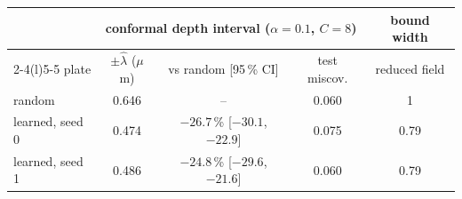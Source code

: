 \begin{tabular}{@{}l ccc c@{}}\toprule
 & \multicolumn{3}{c}{conformal depth interval ($\alpha=0.1$, $C=8$)} & bound width\\
\cmidrule(lr){2-4}\cmidrule(l){5-5}
plate & $\pm\hat\lambda$ ($\mu$m) & vs random [95\,\% CI] & test miscov. & reduced field\\\midrule
random & 0.646 & -- & 0.060 & 1\\
learned, seed 0 & 0.474 & $-26.7$\,\% [$-30.1$, $-22.9$] & 0.075 & 0.79\\
learned, seed 1 & 0.486 & $-24.8$\,\% [$-29.6$, $-21.6$] & 0.060 & 0.79\\
\bottomrule\end{tabular}
